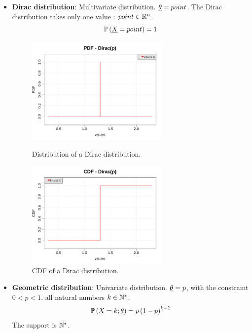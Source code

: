 {\begin{itemize}
\item {\bf Dirac distribution}: Multivariate distribution. ${\underline{\theta}} = point$. The Dirac distribution takes only one value : $point\in{\mathbb R}^n$.
\begin{equation}
{\mathbb P}\left( {\underline{X}} = point \right) = 1
\end{equation}

\begin{figure}[H]
\begin{minipage}{8cm}
\begin{center}
\includegraphics[width=7cm]{Figures/pdf_Dirac.png}
\caption{Distribution of a Dirac distribution.}
\label{PDFDirac}
\end{center}
\end{minipage}
\hfill
\begin{minipage}{8cm}
\begin{center}
\includegraphics[width=7cm]{Figures/cdf_Dirac.png}
\caption{CDF of a Dirac distribution.}
\label{CDFDirac}
\end{center}
\end{minipage}
\end{figure}




\item {\bf Geometric distribution}: Univariate distribution. ${\underline{\theta}} = p$, with the constraint $0<p<1$. all natural numbers $k \in {\mathbb N}^*$,
\begin{equation}
{\mathbb P}\left( X = k ; {\underline{\theta}} \right) = p \left(1-p\right)^{k-1}
\end{equation}
The support is ${\mathbb N}^*$.


\end{itemize}}
